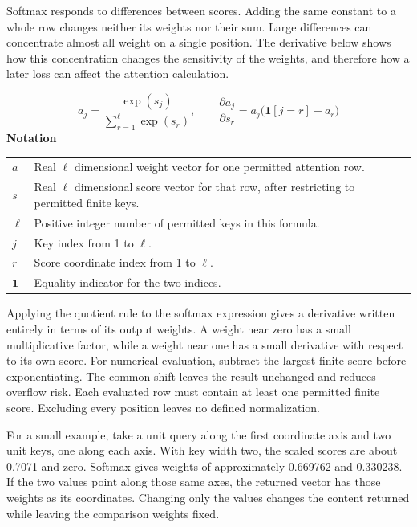 \documentclass[10pt,letterpaper]{article}
\newcommand{\notlabel}{\noindent\textbf{Notation}\par\nobreak\vspace{4pt}}
\begin{document}
Softmax responds to differences between scores. Adding the same constant to a whole row changes neither its weights nor their sum. Large differences can concentrate almost all weight on a single position. The derivative below shows how this concentration changes the sensitivity of the weights, and therefore how a later loss can affect the attention calculation.\par

\par\noindent\begin{minipage}{\linewidth}
\begin{equation}\label{eq:softmax}
a_j=\frac{\exp(s_j)}{\sum_{r=1}^{\ell}\exp(s_r)},\qquad\frac{\partial a_j}{\partial s_r}=a_j\bigl(\mathbf1[j=r]-a_r\bigr)
\end{equation}
\notlabel
{\fontsize{8.5}{10.5}\selectfont\setlength{\tabcolsep}{0pt}\renewcommand{\arraystretch}{1.12}
\begin{tabularx}{\linewidth}{@{}p{.14\linewidth}X@{}}
$a$ & Real \ensuremath{\ell} dimensional weight vector for one permitted attention row.\\
$s$ & Real \ensuremath{\ell} dimensional score vector for that row, after restricting to permitted finite keys.\\
$\ell$ & Positive integer number of permitted keys in this formula.\\
$j$ & Key index from 1 to \ensuremath{\ell}.\\
$r$ & Score coordinate index from 1 to \ensuremath{\ell}.\\
$\mathbf1$ & Equality indicator for the two indices.\\
\end{tabularx}}
\par\vspace{2pt}
\end{minipage}\par
Applying the quotient rule to the softmax expression gives a derivative written entirely in terms of its output weights. A weight near zero has a small multiplicative factor, while a weight near one has a small derivative with respect to its own score. For numerical evaluation, subtract the largest finite score before exponentiating. The common shift leaves the result unchanged and reduces overflow risk. Each evaluated row must contain at least one permitted finite score. Excluding every position leaves no defined normalization.\par

For a small example, take a unit query along the first coordinate axis and two unit keys, one along each axis. With key width two, the scaled scores are about 0.7071 and zero. Softmax gives weights of approximately 0.669762 and 0.330238. If the two values point along those same axes, the returned vector has those weights as its coordinates. Changing only the values changes the content returned while leaving the comparison weights fixed.\par
\end{document}
